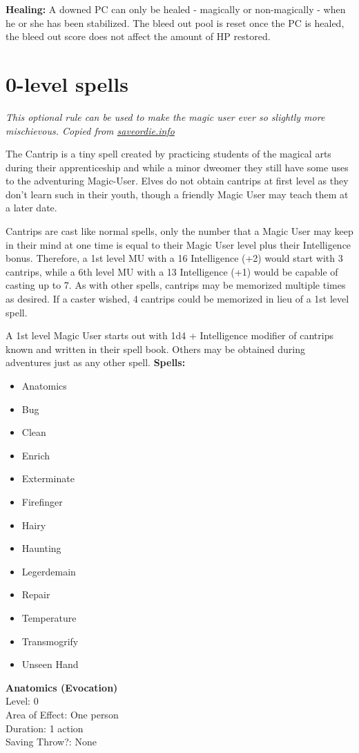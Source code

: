 \documentclass[letterpaper,sansserif,tightsqueeze]{rpg-module}
\begin{document}
\textbf{Healing:} A downed PC can only be healed - magically or non-magically - when he or she has been stabilized. The bleed out pool is reset once the PC is healed, the bleed out score does not affect the amount of HP restored.
\vspace{0.5cm}
\section{0-level spells}
\textit{This optional rule can be used to make the magic user ever so slightly more mischievous. Copied from \href{http://saveordie.info/?p=90}{saveordie.info}}

The Cantrip is a tiny spell created by practicing students of the magical arts during their apprenticeship and while a minor dweomer they still have some uses to the adventuring Magic-User. Elves do not obtain cantrips at first level as they don’t learn such in their youth, though a friendly Magic User may teach them at a later date.

Cantrips are cast like normal spells, only the number that a Magic User may keep in their mind at one time is equal to their Magic User level plus their Intelligence bonus. Therefore, a 1st level MU with a 16 Intelligence (+2) would start with 3 cantrips, while a 6th level MU with a 13 Intelligence (+1) would be capable of casting up to 7. As with other spells, cantrips may be memorized multiple times as desired. If a caster wished, 4 cantrips could be memorized in lieu of a 1st level spell.

A 1st level Magic User starts out with 1d4 + Intelligence modifier of cantrips known and written in their spell book. Others may be obtained during adventures just as any other spell.
\newpage
\textbf{Spells:}
\begin{itemize}
	\item Anatomics
	\item Bug
	\item Clean
	\item Enrich
	\item Exterminate
	\item Firefinger
	\item Hairy
	\item Haunting
	\item Legerdemain
	\item Repair
	\item Temperature
	\item Transmogrify
	\item Unseen Hand
\end{itemize}
\textbf{Anatomics (Evocation)}\\
Level: 0\\
Area of Effect: One person\\
Duration: 1 action\\
Saving Throw?: None
	
\end{document}
